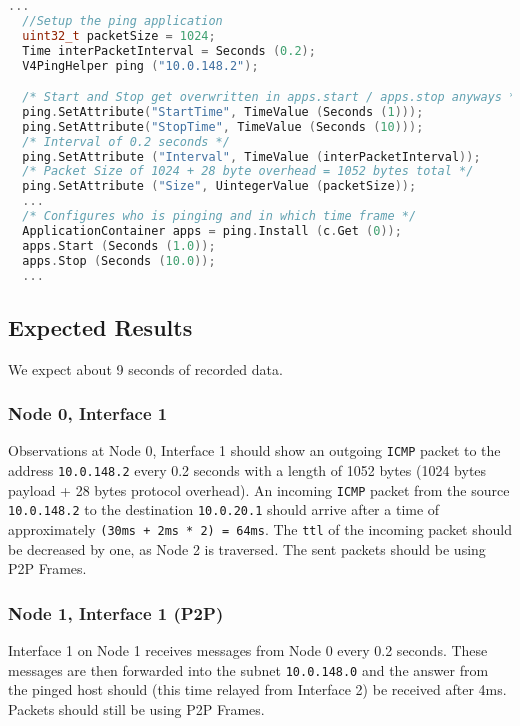 \documentclass[parskip=full]{scrartcl}
\begin{document}
\begin{lstlisting}[language=c++, breaklines, frame=single, caption={Configuration and installation of ping application in Node 1}, label=lst:ns3PingSetup, float, floatplacement=h]
  ...
  //Setup the ping application
  uint32_t packetSize = 1024;
  Time interPacketInterval = Seconds (0.2);
  V4PingHelper ping ("10.0.148.2");

  /* Start and Stop get overwritten in apps.start / apps.stop anyways */
  ping.SetAttribute("StartTime", TimeValue (Seconds (1)));
  ping.SetAttribute("StopTime", TimeValue (Seconds (10)));
  /* Interval of 0.2 seconds */
  ping.SetAttribute ("Interval", TimeValue (interPacketInterval));
  /* Packet Size of 1024 + 28 byte overhead = 1052 bytes total */
  ping.SetAttribute ("Size", UintegerValue (packetSize));
  ...
  /* Configures who is pinging and in which time frame */
  ApplicationContainer apps = ping.Install (c.Get (0));
  apps.Start (Seconds (1.0));
  apps.Stop (Seconds (10.0));
  ...
\end{lstlisting}


\subsection{Expected Results}
We expect about 9 seconds of recorded data. 
\subsubsection{Node 0, Interface 1}
Observations at Node 0, Interface 1 should show an outgoing \texttt{ICMP} packet to the address \texttt{10.0.148.2} every 0.2 seconds with a length of 1052 bytes (1024 bytes payload + 28 bytes protocol overhead).
An incoming \texttt{ICMP} packet from the source \texttt{10.0.148.2} to the destination \texttt{10.0.20.1} should arrive after a time of approximately \texttt{(30ms + 2ms * 2) = 64ms}.
The \texttt{ttl} of the incoming packet should be decreased by one, as Node 2 is traversed.
The sent packets should be using P2P Frames. 

\subsubsection{Node 1, Interface 1 (P2P)}
Interface 1 on Node 1 receives messages from Node 0 every 0.2 seconds.
These messages are then forwarded into the subnet \texttt{10.0.148.0} and the answer from the pinged host should (this time relayed from Interface 2) be received after 4ms.
Packets should still be using P2P Frames.
\end{document}
